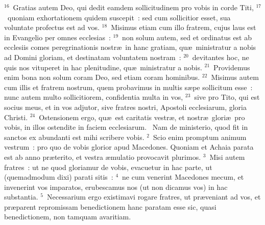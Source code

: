 ${}^{16}$~Gratias autem Deo, qui dedit eamdem sollicitudinem pro vobis in corde Titi,
${}^{17}$~quoniam exhortationem quidem suscepit~: sed cum sollicitior esset, sua voluntate profectus est ad vos.
${}^{18}$~Misimus etiam cum illo fratrem, cujus laus est in Evangelio per omnes ecclesias~:
${}^{19}$~non solum autem, sed et ordinatus est ab ecclesiis comes peregrinationis nostr\ae\ in hanc gratiam, qu\ae\ ministratur a nobis ad Domini gloriam, et destinatam voluntatem nostram~:
${}^{20}$~devitantes hoc, ne quis nos vituperet in hac plenitudine, qu\ae\ ministratur a nobis.
${}^{21}$~Providemus enim bona non solum coram Deo, sed etiam coram hominibus.
${}^{22}$~Misimus autem cum illis et fratrem nostrum, quem probavimus in multis s\ae pe sollicitum esse~: nunc autem multo sollicitiorem, confidentia multa in vos,
${}^{23}$~sive pro Tito, qui est socius meus, et in vos adjutor, sive fratres nostri, Apostoli ecclesiarum, gloria Christi.
${}^{24}$~Ostensionem ergo, qu\ae\ est caritatis vestr\ae , et nostr\ae\ glori\ae\ pro vobis, in illos ostendite in faciem ecclesiarum.
~Nam de ministerio, quod fit in sanctos ex abundanti est mihi scribere vobis.
${}^{2}$~Scio enim promptum animum vestrum~: pro quo de vobis glorior apud Macedones. Quoniam et Achaia parata est ab anno pr\ae terito, et vestra \ae mulatio provocavit plurimos.
${}^{3}$~Misi autem fratres~: ut ne quod gloriamur de vobis, evacuetur in hac parte, ut (quemadmodum dixi) parati sitis~:
${}^{4}$~ne cum venerint Macedones mecum, et invenerint vos imparatos, erubescamus nos (ut non dicamus vos) in hac substantia.
${}^{5}$~Necessarium ergo existimavi rogare fratres, ut pr\ae veniant ad vos, et pr\ae parent repromissam benedictionem hanc paratam esse sic, quasi benedictionem, non tamquam avaritiam.



